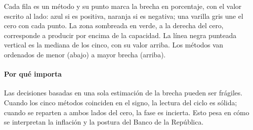 \begin{leer}
Cada fila es un método y su punto marca la brecha en porcentaje, con el valor escrito al lado: azul si es positiva, naranja si es negativa; una varilla gris une el cero con cada punto. La zona sombreada en verde, a la derecha del cero, corresponde a producir por encima de la capacidad. La línea negra punteada vertical es la mediana de los cinco, con su valor arriba. Los métodos van ordenados de menor (abajo) a mayor brecha (arriba).
\end{leer}

\paragraph{Por qué importa}
Las decisiones basadas en una sola estimación de la brecha pueden ser frágiles. Cuando los cinco métodos coinciden en el signo, la lectura del ciclo es sólida; cuando se reparten a ambos lados del cero, la fase es incierta. Esto pesa en cómo se interpretan la inflación y la postura del Banco de la República.

